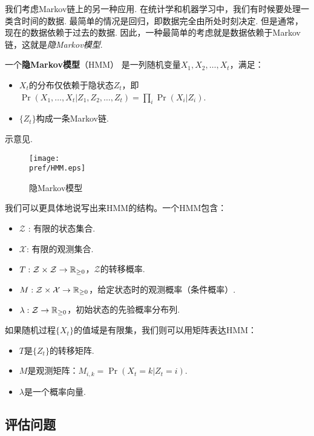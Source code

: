 我们考虑Markov链上的另一种应用. 在统计学和机器学习中，我们有时候要处理一类含时间的数据. 最简单的情况是回归，即数据完全由所处时刻决定. 但是通常，现在的数据依赖于过去的数据. 因此，一种最简单的考虑就是数据依赖于Markov链，这就是\emph{隐Markov模型}.

\begin{definition}[隐Markov模型]
一个\textbf{隐Markov模型}（HMM） 是一列随机变量$X_1,X_2,\dots, X_t$，满足：
    \begin{itemize}
        \item $X_t$的分布仅依赖于隐状态$Z_t$，即$\Pr(X_1,\dots,X_t|Z_1,Z_2,\dots,Z_t)=\prod_i \Pr(X_i|Z_i)$.
        \item $\{Z_t\}$构成一条Markov链.
    \end{itemize}
\end{definition}
示意见.
\begin{figure}[ht]
    \centering
    \texttt{[image: \\pref/HMM.eps]}
    \caption{隐Markov模型}
    \label{fig:HMM}
\end{figure}    



我们可以更具体地说写出来HMM的结构。一个HMM包含：
    \begin{itemize}
        \item $\mathcal Z$
        : 有限的状态集合.
        \item $\mathcal X$: 有限的观测集合.
        \item $T: \mathcal Z\times\mathcal Z\to \mathbb{R}_{\geq 0}$，$\mathcal Z$的转移概率.
        \item $M:\mathcal Z\times \mathcal X\to \mathbb{R}_{\geq 0}$，给定状态时的观测概率（条件概率）.
        \item $\lambda:\mathcal Z\to\mathbb{R}_{\geq 0}$，初始状态的先验概率分布列.
    \end{itemize}
如果随机过程$\{X_t\}$的值域是有限集，我们则可以用矩阵表达HMM：
    \begin{itemize}
    \item $T$是$\{Z_t\}$的转移矩阵.
    \item $M$是观测矩阵：$M_{i,k} = \Pr(X_t=k|Z_t=i)$.
    \item $\lambda$是一个概率向量.
    \end{itemize}


\subsection{评估问题}

